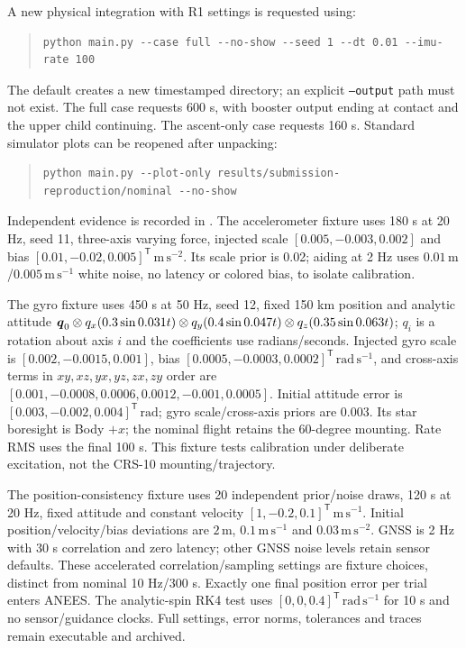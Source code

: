 A new physical integration with R1 settings is requested using:
\begin{quote}\small
\begin{verbatim}
python main.py --case full --no-show --seed 1 --dt 0.01 --imu-rate 100
\end{verbatim}
\end{quote}
The default creates a new timestamped directory; an explicit \texttt{--output} path must not exist. The full case requests 600 s, with booster output ending at contact and the upper child continuing. The ascent-only case requests 160 s. Standard simulator plots can be reopened after unpacking:
\begin{quote}\small
\begin{verbatim}
python main.py --plot-only results/submission-reproduction/nominal --no-show
\end{verbatim}
\end{quote}
Independent evidence is recorded in . The accelerometer fixture uses 180 s at 20 Hz, seed 11, three-axis varying force, injected scale $[0.005,-0.003,0.002]$ and bias $[0.01,-0.02,0.005]^{\mathsf T}\,\mathrm{m\,s^{-2}}$. Its scale prior is 0.02; aiding at 2 Hz uses $0.01\,\mathrm{m}$/$0.005\,\mathrm{m\,s^{-1}}$ white noise, no latency or colored bias, to isolate calibration.

The gyro fixture uses 450 s at 50 Hz, seed 12, fixed 150 km position and analytic attitude $\boldsymbol{q}_0\otimes q_x(0.3\sin0.031t)\otimes q_y(0.4\sin0.047t)\otimes q_z(0.35\sin0.063t)$; $q_i$ is a rotation about axis $i$ and the coefficients use radians/seconds. Injected gyro scale is $[0.002,-0.0015,0.001]$, bias $[0.0005,-0.0003,0.0002]^{\mathsf T}\,\mathrm{rad\,s^{-1}}$, and cross-axis terms in $xy,xz,yx,yz,zx,zy$ order are $[0.001,-0.0008,0.0006,0.0012,-0.001,0.0005]$. Initial attitude error is $[0.003,-0.002,0.004]^{\mathsf T}\,\mathrm{rad}$; gyro scale/cross-axis priors are 0.003. Its star boresight is Body $+x$; the nominal flight retains the 60-degree mounting. Rate RMS uses the final 100 s. This fixture tests calibration under deliberate excitation, not the CRS-10 mounting/trajectory.

The position-consistency fixture uses 20 independent prior/noise draws, 120 s at 20 Hz, fixed attitude and constant velocity $[1,-0.2,0.1]^{\mathsf T}\,\mathrm{m\,s^{-1}}$. Initial position/velocity/bias deviations are $2\,\mathrm{m}$, $0.1\,\mathrm{m\,s^{-1}}$ and $0.03\,\mathrm{m\,s^{-2}}$. GNSS is 2 Hz with 30 s correlation and zero latency; other GNSS noise levels retain sensor defaults. These accelerated correlation/sampling settings are fixture choices, distinct from nominal 10 Hz/300 s. Exactly one final position error per trial enters ANEES. The analytic-spin RK4 test uses $[0,0,0.4]^{\mathsf T}\,\mathrm{rad\,s^{-1}}$ for 10 s and no sensor/guidance clocks. Full settings, error norms, tolerances and traces remain executable and archived.

